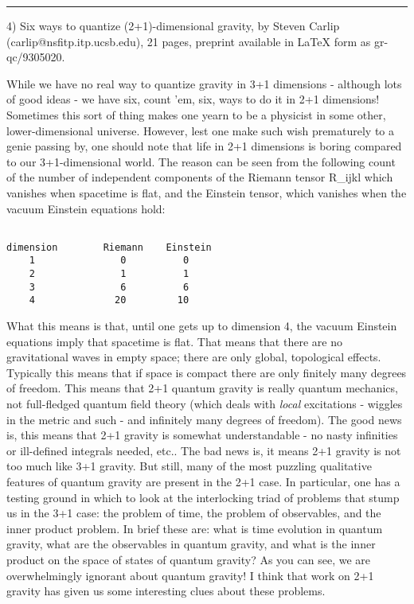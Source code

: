 \par\noindent\rule{\textwidth}{0.4pt}

4) Six ways to quantize (2+1)-dimensional gravity, by Steven Carlip
(carlip@nsfitp.itp.ucsb.edu), 21 pages, preprint available in LaTeX form as
gr-qc/9305020.

While we have no real way to quantize gravity in 3+1 dimensions -
although lots of good ideas - we have six, count 'em, six, ways to do it
in 2+1 dimensions!  Sometimes this sort of thing makes one yearn to be a
physicist in some other, lower-dimensional universe.  However, lest one
make such wish prematurely to a genie passing by, one should note that
life in 2+1 dimensions is boring compared to our 3+1-dimensional world.
The reason can be seen from the following count of the number of
independent components of the Riemann tensor R_{ijkl} which vanishes
when spacetime is flat, and the Einstein tensor, which vanishes when the
vacuum Einstein equations hold:


\begin{verbatim}

dimension        Riemann    Einstein
    1               0          0
    2               1          1
    3               6          6
    4              20         10  
\end{verbatim}
    

What this means is that, until one gets up to dimension 4, the vacuum
Einstein equations imply that spacetime is flat.  That means that there
are no gravitational waves in empty space; there are only global,
topological effects.  Typically this means that if space is compact
there are only finitely many degrees of freedom.  This means that 2+1
quantum gravity is really quantum mechanics, not full-fledged quantum
field theory (which deals with \emph{local} excitations - wiggles in the
metric and such - and infinitely many degrees of freedom).  The good
news is, this means that 2+1 gravity is somewhat understandable - no nasty
infinities or ill-defined integrals needed, etc..  The bad news is, it
means 2+1 gravity is not too much like 3+1 gravity.  But still, many of
the most puzzling qualitative features of quantum gravity are present in
the 2+1 case.  In particular, one has a testing ground in which to look
at the interlocking triad of problems that stump us in the 3+1 case: the
problem of time, the problem of observables, and the inner product
problem.  In brief these are: what is time evolution in quantum
gravity, what are the observables in quantum gravity, and what is the
inner product on the space of states of quantum gravity?  As you can
see, we are overwhelmingly ignorant about quantum gravity!  I think
that work on 2+1 gravity has given us some interesting clues about these
problems.  

